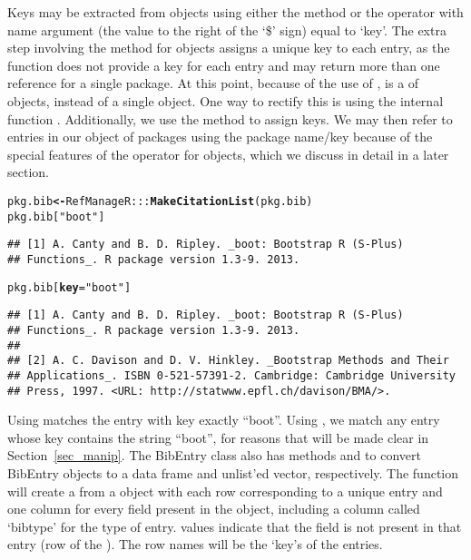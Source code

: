 \documentclass[article]{jss}\usepackage[]{graphicx}\usepackage[]{color}
\makeatletter
\newcommand{\hlstr}[1]{\textcolor[rgb]{0.125,0.125,1}{#1}}%
\newcommand{\hlstd}[1]{\textcolor[rgb]{0.251,0.251,0.282}{#1}}%
\newcommand{\hlkwb}[1]{\textcolor[rgb]{0.439,0.251,1}{\textbf{#1}}}%
\newcommand{\hlkwc}[1]{\textcolor[rgb]{0.529,0,0.184}{\textbf{#1}}}%
\newcommand{\hlkwd}[1]{\textcolor[rgb]{0.251,0.251,0.282}{\textbf{#1}}}%
\newenvironment{kframe}{%
 \def\at@end@of@kframe{}%
 \ifinner\ifhmode%
  \def\at@end@of@kframe{\end{minipage}}%
  \begin{minipage}{\columnwidth}%
 \fi\fi%
 \def\FrameCommand##1{\hskip\@totalleftmargin \hskip-\fboxsep
 \colorbox{shadecolor}{##1}\hskip-\fboxsep
     \hskip-\linewidth \hskip-\@totalleftmargin \hskip\columnwidth}%
 \MakeFramed {\advance\hsize-\width
   \@totalleftmargin\z@ \linewidth\hsize
   \@setminipage}}%
 {\par\unskip\endMakeFramed%
 \at@end@of@kframe}
\newenvironment{knitrout}{}{} %
\newcommand{\bt}{\`{}}
\makeatother
\begin{document}
Keys may be extracted from  objects using either the  method or the \code{\bt$\bt} operator with name argument (the value to the right of the `\$' sign) equal to `key'.  The extra step involving the  method for  objects assigns a unique key to each entry, as the  function does not provide a key for each entry and may return more than one reference for a single package.  At this point, because of the use of ,  is a  of  objects, instead of a single  object.  One way to rectify this is using the internal function .  Additionally, we use the  method to assign keys.  We may then refer to entries in our  object of packages using the package name/key because of the special features of the \code{\bt[\bt} operator for  objects, which we discuss in detail in a later section.
\begin{knitrout}
\color{fgcolor}\begin{kframe}
\begin{alltt}
\hlstd{pkg.bib} \hlkwb{<-} \hlstd{RefManageR:::}\hlkwd{MakeCitationList}\hlstd{(pkg.bib)}
\hlstd{pkg.bib[}\hlstr{"boot"}\hlstd{]}
\end{alltt}
\begin{verbatim}
## [1] A. Canty and B. D. Ripley. _boot: Bootstrap R (S-Plus)
## Functions_. R package version 1.3-9. 2013.
\end{verbatim}
\begin{alltt}
\hlstd{pkg.bib[}\hlkwc{key} \hlstd{=} \hlstr{"boot"}\hlstd{]}
\end{alltt}
\begin{verbatim}
## [1] A. Canty and B. D. Ripley. _boot: Bootstrap R (S-Plus)
## Functions_. R package version 1.3-9. 2013.
## 
## [2] A. C. Davison and D. V. Hinkley. _Bootstrap Methods and Their
## Applications_. ISBN 0-521-57391-2. Cambridge: Cambridge University
## Press, 1997. <URL: http://statwww.epfl.ch/davison/BMA/>.
\end{verbatim}
\end{kframe}
\end{knitrout}

Using  matches the entry with key exactly ``boot''.  Using , we match any entry whose key contains the string ``boot'', for reasons that will be made clear in Section~\ref{sec_manip}.
The BibEntry class also has methods  and  to convert BibEntry objects to a data frame and unlist'ed vector, respectively.  The function  will create  a  from a  object with each row corresponding to a unique entry and one column for every field present in the  object, including a column called `bibtype' for the type of entry.   values indicate that the field is not present in that entry (row of the ).  The row names will be the `key's of the entries.
\end{document}
